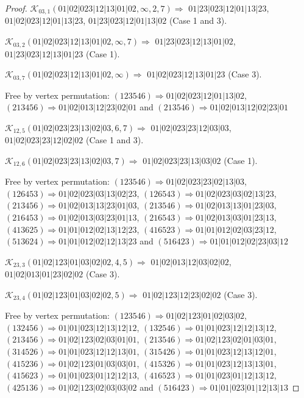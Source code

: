 \documentclass[12pt]{article}
\theoremstyle{plain}
\theoremstyle{definition}
\theoremstyle{remark}
\newcommand{\fancy}[1]{\mathcal{#1}}
\def\K{\fancy{K}}
\begin{document}
\begin{proof}
	
	
	\bigskip
	
	$\K_{03,1}(01|02|023|12|13|01|02,\infty,2, 7)\Rightarrow $ $01|23|023|12|01|13|23$, $01|02|023|12|01|13|23$, $01|23|023|12|01|13|02$ (Case 1 and 3).
	
	$\K_{03,2}(01|02|023|12|13|01|02,\infty,7)\Rightarrow $ $01|23|023|12|13|01|02$, $01|23|023|12|13|01|23$ (Case 1).
	
	$\K_{03,7}(01|02|023|12|13|01|02,\infty)\Rightarrow $ $01|02|023|12|13|01|23$ (Case 3).
	
	
	
	Free by vertex permutation: $(1 2 3 5 4 6)\Rightarrow 01|02|023|12|01|13|02$, $(2 1 3 4 5 6)\Rightarrow 01|02|013|12|23|02|01$ and $(2 1 3 5 4 6)\Rightarrow 01|02|013|12|02|23|01$
	
	
	
	\bigskip
	
	$\K_{12,5}(01|02|023|23|13|02|03,6, 7)\Rightarrow $ $01|02|023|23|12|03|03$, $01|02|023|23|12|02|02$ (Case 1 and 3).
	
	$\K_{12,6}(01|02|023|23|13|02|03,7)\Rightarrow $ $01|02|023|23|13|03|02$ (Case 1).
	
	
	
	Free by vertex permutation: $(1 2 3 5 4 6)\Rightarrow 01|02|023|23|02|13|03$, $(1 2 6 4 5 3)\Rightarrow 01|02|023|03|13|02|23$, $(1 2 6 5 4 3)\Rightarrow 01|02|023|03|02|13|23$, $(2 1 3 4 5 6)\Rightarrow 01|02|013|13|23|01|03$, $(2 1 3 5 4 6)\Rightarrow 01|02|013|13|01|23|03$, $(2 1 6 4 5 3)\Rightarrow 01|02|013|03|23|01|13$, $(2 1 6 5 4 3)\Rightarrow 01|02|013|03|01|23|13$, $(4 1 3 6 2 5)\Rightarrow 01|01|012|02|13|12|23$, $(4 1 6 5 2 3)\Rightarrow 01|01|012|02|03|23|12$, $(5 1 3 6 2 4)\Rightarrow 01|01|012|02|12|13|23$ and $(5 1 6 4 2 3)\Rightarrow 01|01|012|02|23|03|12$
	
	
	
	\bigskip
	
	$\K_{23,3}(01|02|123|01|03|02|02,4, 5)\Rightarrow $ $01|02|013|12|03|02|02$, $01|02|013|01|23|02|02$ (Case 3).
	
	$\K_{23,4}(01|02|123|01|03|02|02,5)\Rightarrow $ $01|02|123|12|23|02|02$ (Case 3).
	
	
	
	Free by vertex permutation: $(1 2 3 5 4 6)\Rightarrow 01|02|123|01|02|03|02$, $(1 3 2 4 5 6)\Rightarrow 01|01|023|12|13|12|12$, $(1 3 2 5 4 6)\Rightarrow 01|01|023|12|12|13|12$, $(2 1 3 4 5 6)\Rightarrow 01|02|123|02|03|01|01$, $(2 1 3 5 4 6)\Rightarrow 01|02|123|02|01|03|01$, $(3 1 4 5 2 6)\Rightarrow 01|01|023|12|12|13|01$, $(3 1 5 4 2 6)\Rightarrow 01|01|023|12|13|12|01$, $(4 1 5 2 3 6)\Rightarrow 01|02|123|01|03|03|01$, $(4 1 5 3 2 6)\Rightarrow 01|01|023|12|13|13|01$, $(4 1 5 6 2 3)\Rightarrow 01|01|023|01|12|12|13$, $(4 1 6 5 2 3)\Rightarrow 01|01|023|01|12|13|12$, $(4 2 5 1 3 6)\Rightarrow 01|02|123|02|03|03|02$ and $(5 1 6 4 2 3)\Rightarrow 01|01|023|01|12|13|13$
	

\end{proof}
\end{document}
